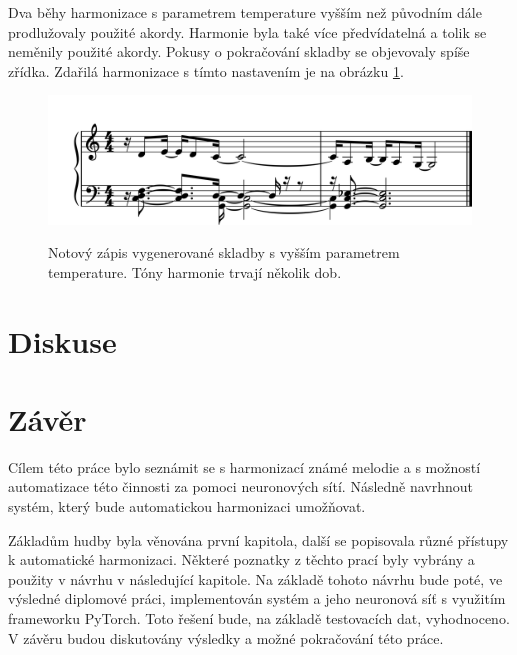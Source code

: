 Dva běhy harmonizace s parametrem temperature vyšším než původním
dále prodlužovaly použité akordy.
Harmonie byla také více předvídatelná a tolik se neměnily použité akordy.
Pokusy o pokračování skladby se objevovaly spíše zřídka.
Zdařilá harmonizace s tímto nastavením je na obrázku 
\ref{obrazekKratkaSkladbaHarmonizovanaHighNoty}.

\begin{figure}[h]\centering
    \centering
    \includegraphics[width=0.8\linewidth]{obrazky/KratkaSkladbaHarmonizovanaHighNoty-1.png}\\[1pt]  
    \caption{Notový zápis vygenerované skladby s vyšším parametrem temperature. 
    Tóny harmonie trvají několik dob.}    
    \label{obrazekKratkaSkladbaHarmonizovanaHighNoty}
\end{figure}
\par

\chapter{Diskuse}

\chapter{Závěr}
\label{zaver}
Cílem této práce bylo seznámit se s harmonizací známé melodie a 
s možností automatizace této činnosti za pomoci neuronových sítí.
Následně navrhnout systém, který bude automatickou harmonizaci umožňovat.
\par

Základům hudby byla věnována první kapitola, 
další se popisovala různé přístupy k automatické harmonizaci. 
Některé poznatky z těchto prací byly vybrány a použity v návrhu v následující kapitole.
Na základě tohoto návrhu bude poté, ve výsledné diplomové práci, 
implementován systém a jeho neuronová síť s využitím frameworku PyTorch.
Toto řešení bude, na základě testovacích dat, vyhodnoceno.
V závěru budou diskutovány výsledky a možné pokračování této práce.
